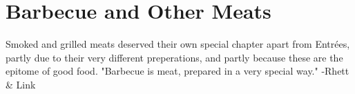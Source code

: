 \chapter{Barbecue and Other Meats}
\label{barbecueAndOtherMeats}
\setcounter{secnumdepth}{0}
\minitoc
Smoked and grilled meats deserved their own special chapter apart from Entrées, partly due to their very different preperations, and partly because these are the epitome of good food. "Barbecue is meat, prepared in a very special way." -Rhett \& Link
\clearpage

%
%
%
%
%
%
%